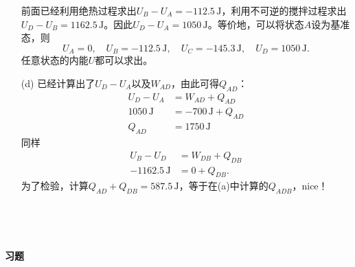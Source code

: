 \begin{enumerate}
		前面已经利用绝热过程求出$U_B - U_A = -112.5 \,\mathrm{J}$，利用不可逆的搅拌过程求出$U_D - U_B = 1162.5 \,\mathrm{J}$。因此$U_D - U_A = 1050 \,\mathrm{J}$。等价地，可以将状态$A$设为基准态，则
		\[
			U_A = 0, \quad U_B = -112.5 \,\mathrm{J}, \quad U_C = -145.3 \,\mathrm{J}, \quad U_D = 1050 \,\mathrm{J}.
		\]
	任意状态的内能$U$都可以求出。
	\item[(d)]
		已经计算出了$U_D - U_A$以及$W_{AD}$，由此可得$Q_{AD}$：
		\begin{align*}
			U_D - U_A &= W_{AD} + Q_{AD} \\
			1050 \,\mathrm{J} &= -700 \,\mathrm{J} + Q_{AD} \\
			Q_{AD} &= 1750 \,\mathrm{J}
		\end{align*}
		同样
		\begin{align*}
			U_B - U_D &= W_{DB} + Q_{DB} \\
			-1162.5 \,\mathrm{J} &= 0 + Q_{DB}.
		\end{align*}
		为了检验，计算$Q_{AD} + Q_{DB} = 587.5 \,\mathrm{J}$，等于在(a)中计算的$Q_{ADB}$，nice！
\end{enumerate}

\ 

\ 

{\bf \Large 习题}
\ 

